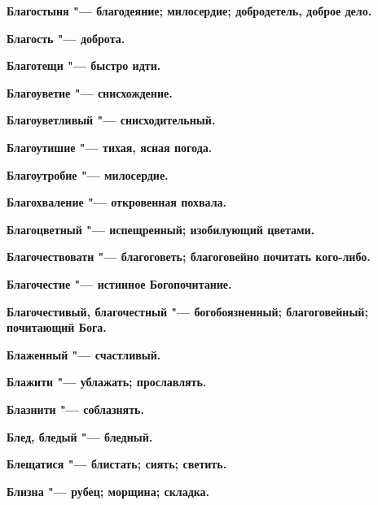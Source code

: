\bfseries Благостыня \normalfont{} "--- благодеяние; милосердие; добродетель, доброе дело. 




\bfseries Благость \normalfont{} "--- доброта. 




\bfseries Благотещи \normalfont{} "--- быстро идти. 




\bfseries Благоуветие \normalfont{} "--- снисхождение. 




\bfseries Благоуветливый \normalfont{} "--- снисходительный. 




\bfseries Благоутишие \normalfont{} "--- тихая, ясная погода. 




\bfseries Благоутробие \normalfont{} "--- милосердие. 




\bfseries Благохваление \normalfont{} "--- откровенная похвала. 




\bfseries Благоцветный \normalfont{} "--- испещренный; изобилующий цветами. 




\bfseries Благочествовати \normalfont{} "--- благоговеть; благоговейно почитать кого-либо. 




\bfseries Благочестие \normalfont{} "--- истинное Богопочитание. 




\bfseries Благочестивый, благочестный \normalfont{} "--- богобоязненный; благоговейный; почитающий Бога. 




\bfseries Блаженный \normalfont{} "--- счастливый. 




\bfseries Блажити \normalfont{} "--- ублажать; прославлять. 




\bfseries Блазнити \normalfont{} "--- соблазнять. 




\bfseries Блед, бледый \normalfont{} "--- бледный. 




\bfseries Блещатися \normalfont{} "--- блистать; сиять; светить. 




\bfseries Близна \normalfont{} "--- рубец; морщина; складка. 




